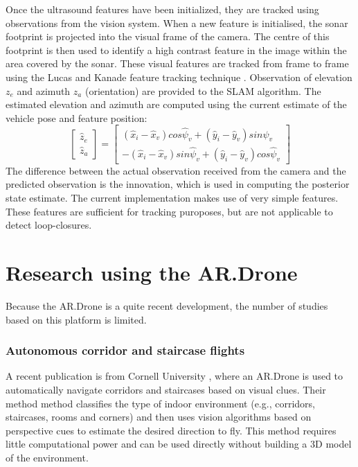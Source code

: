 Once the ultrasound features have been initialized, they are tracked using observations from the vision system.
When a new feature is initialised, the sonar footprint is projected into the visual frame of the camera.
The centre of this footprint is then used to identify a high contrast feature in the image within the area covered by the sonar.
These visual features are tracked from frame to frame using the Lucas and Kanade feature tracking technique \cite{lucas1998application}.
Observation of elevation $z_e$ and azimuth $z_a$ (orientation) are provided to the SLAM algorithm.
The estimated elevation and azimuth are computed using the current estimate of the vehicle pose and feature position:
\begin{equation}
\left[ {
\begin{array}{c} \hat{z}_e \\ \hat{z}_a \end{array}
} \right] =
\left[ {
\begin{array}{c}
	(\hat{x}_i - \hat{x}_v) cos \hat{\psi}_v + (\hat{y}_i - \hat{y}_v) sin \hat{\psi}_v \\
	-(\hat{x}_i - \hat{x}_v) sin \hat{\psi}_v + (\hat{y}_i - \hat{y}_v) cos \hat{\psi}_v
\end{array}
} \right]
\end{equation}
The difference between the actual observation received from the camera and the predicted observation is the innovation, which is used in computing the posterior state estimate.
The current implementation makes use of very simple features.
These features are sufficient for tracking puroposes, but are not applicable to detect loop-closures.


\section{Research using the AR.Drone}
Because the AR.Drone is a quite recent development, the number of studies based on this platform is limited.

\subsubsection{Autonomous corridor and staircase flights}

A recent publication is from Cornell University \cite{Bills2011icra}, where an AR.Drone is used to automatically navigate corridors and staircases based on visual clues.
Their method method classifies the type of indoor environment (e.g., corridors, staircases, rooms and corners) and then uses vision algorithms based on perspective cues to estimate the desired direction to fly.
This method requires little computational power and can be used directly without building a 3D model of the environment.

